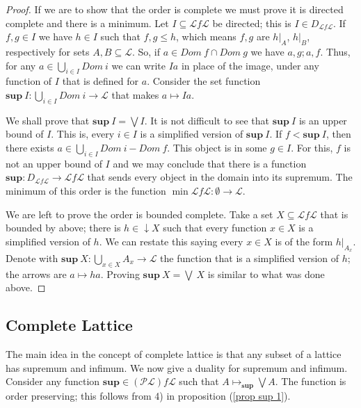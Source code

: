 \documentclass [12pt]{book}
\begin{document}
\begin{proof}If we are to show that the order is complete we must prove it is directed complete and there is a minimum. Let $I\subseteq\mathcal Lf\mathcal L$ be directed; this is $I\in D_{\mathcal Lf\mathcal L}$. If $f,g\in I$ we have $h\in I$ such that $f,g\leq h$, which means $f,g$ are $h|_A$, $h|_B$, respectively for sets $A,B\subseteq\mathcal L$. So, if $a\in Dom~f\cap Dom~g$ we have $a,g;a,f$. Thus, for any $a\in\bigcup_{i\in I}Dom~i$ we can write $Ia$ in place of the image, under any function of $I$ that is defined for $a$. Consider the set function $\textbf{sup}~I:\bigcup_{i\in I} Dom~i\rightarrow\mathcal L$ that makes $a\mapsto Ia$.

We shall prove that $\textbf{sup}~I=\bigvee I$. It is not difficult to see that $\textbf{sup}~I$ is an upper bound of $I$. This is, every $i\in I$ is a simplified version of $\textbf{sup}~I$. If $f<\textbf{sup}~I$, then there exists $a\in\bigcup_{i\in I}Dom~i- Dom~f$. This object is in some $g\in I$. For this, $f$ is not an upper bound of $I$ and we may conclude that there is a function $\textbf{sup}:D_{\mathcal Lf\mathcal L}\rightarrow\mathcal Lf\mathcal L$ that sends every object in the domain into its supremum. The minimum of this order is the function $\min\mathcal Lf\mathcal L:\emptyset\rightarrow\mathcal L$.

We are left to prove the order is bounded complete. Take a set $X\subseteq \mathcal Lf\mathcal L$ that is bounded by above; there is $h\in\downarrow X$ such that every function $x\in X$ is a simplified version of $h$. We can restate this saying every $x\in X$ is of the form $h|_{A_x}$. Denote with $\textbf{sup}~X:\bigcup_{x\in X}A_x\rightarrow\mathcal L$ the function that is a simplified version of $h$; the arrows are $a\mapsto ha$. Proving $\textbf{sup}~X=\bigvee~X$ is similar to what was done above.\end{proof}

		\subsection{Complete Lattice}

The main idea in the concept of complete lattice is that any subset of a lattice has supremum and infimum. We now give a duality for supremum and infimum. Consider any function $\textbf{sup}\in(\mathcal{PL})f\mathcal L$ such that $A\mapsto_{\textbf{sup}}\bigvee A$. The function is order preserving; this follows from 4) in proposition (\ref{prop sup 1}).
\end{document}
